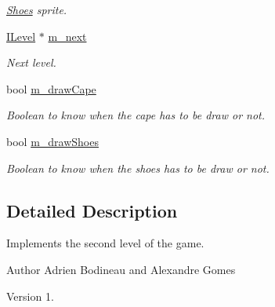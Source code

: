 \begin{DoxyCompactItemize}
\begin{DoxyCompactList}\small\item\em \hyperlink{class_shoes}{Shoes} sprite. \end{DoxyCompactList}\item 
\hypertarget{class_level_two_a03014f87143fa101cd69dc0601916c20}{\hyperlink{class_i_level}{I\-Level} $\ast$ \hyperlink{class_level_two_a03014f87143fa101cd69dc0601916c20}{m\-\_\-next}}\label{class_level_two_a03014f87143fa101cd69dc0601916c20}

\begin{DoxyCompactList}\small\item\em Next level. \end{DoxyCompactList}\item 
\hypertarget{class_level_two_a094097697073aa1b33c71d70be269188}{bool \hyperlink{class_level_two_a094097697073aa1b33c71d70be269188}{m\-\_\-draw\-Cape}}\label{class_level_two_a094097697073aa1b33c71d70be269188}

\begin{DoxyCompactList}\small\item\em Boolean to know when the cape has to be draw or not. \end{DoxyCompactList}\item 
\hypertarget{class_level_two_abb41ddfe6e50c101fc35f8cf920b815d}{bool \hyperlink{class_level_two_abb41ddfe6e50c101fc35f8cf920b815d}{m\-\_\-draw\-Shoes}}\label{class_level_two_abb41ddfe6e50c101fc35f8cf920b815d}

\begin{DoxyCompactList}\small\item\em Boolean to know when the shoes has to be draw or not. \end{DoxyCompactList}\end{DoxyCompactItemize}


\subsection{Detailed Description}
Implements the second level of the game. 

\begin{DoxyAuthor}{Author}
Adrien Bodineau and Alexandre Gomes 
\end{DoxyAuthor}
\begin{DoxyVersion}{Version}
1. 
\end{DoxyVersion}


